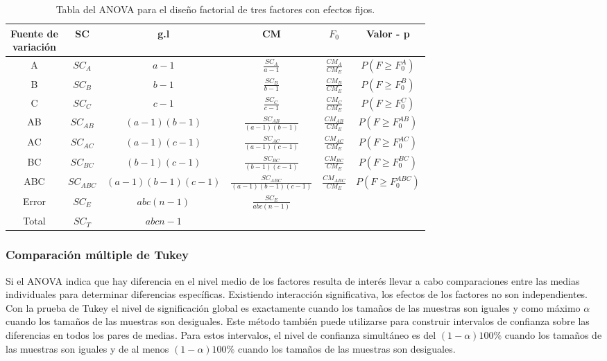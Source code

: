 \begin{table}
	\centering
	\begin{tabular}{|c|c|c|c|c|c|}
		\hline
		\makecell{Fuente de \\ variación} & SC & g.l & CM & $F_{0}$ & Valor - p \\ %
		\hline
		A & $SC_{A}$ & $a-1$ & $\frac{SC_{A}}{a-1}$ &  $\frac{CM_{A}}{CM_{E}}$ & $P(F \geq F_{0}^{A} )$ \\
		\hline
		B & $SC_{B}$ & $b-1$ & $\frac{SC_{B}}{b-1}$ &  $\frac{CM_{B}}{CM_{E}}$ & $P(F \geq F_{0}^{B} )$ \\
		\hline
		C & $SC_{C}$ & $c-1$ & $\frac{SC_{C}}{c-1}$ &  $\frac{CM_{C}}{CM_{E}}$ & $P(F \geq F_{0}^{C} )$ \\
		\hline
		AB & $SC_{AB}$ & $(a-1)(b-1)$ & $\frac{SC_{AB}}{(a-1)(b-1)}$ &  $\frac{CM_{AB}}{CM_{E}}$ & $P(F \geq F_{0}^{AB} )$ \\
		\hline
		AC & $SC_{AC}$ & $(a-1)(c-1)$ & $\frac{SC_{AC}}{(a-1)(c-1)}$ &  $\frac{CM_{AC}}{CM_{E}}$ & $P(F \geq F_{0}^{AC} )$ \\
		\hline
		BC & $SC_{BC}$ & $(b-1)(c-1) $ & $\frac{SC_{BC}}{(b-1)(c-1)}$ &  $\frac{CM_{BC}}{CM_{E}}$ & $P(F \geq F_{0}^{BC} )$ \\
		\hline
		ABC & $SC_{ABC}$ & $(a-1)(b-1)(c-1)$ & $\frac{SC_{ABC}}{(a-1)(b-1)(c-1)}$ &  $\frac{CM_{ABC}}{CM_{E}}$ & $P(F \geq F_{0}^{ABC} )$ \\
		\hline
		Error & $SC_{E} $ & $abc(n-1)$ & $\frac{SC_{E}}{abc(n-1)}$ & & \\
		\hline
		Total & $SC_{T}$ & $abcn-1$ & & &  \\
		\hline
	\end{tabular}
	\caption{Tabla del ANOVA para el diseño factorial de tres factores con efectos fijos.}
\end{table}
\FloatBarrier

\subsubsection{Comparación múltiple de Tukey \parencite{montgomery-2017}}

Si el ANOVA indica que hay diferencia en el nivel medio de los factores resulta de interés llevar a cabo comparaciones entre las medias individuales para determinar diferencias específicas. Existiendo interacción significativa, los efectos de los factores no son independientes.\\


Con la prueba de Tukey el nivel de significación global es exactamente  cuando los tamaños de las muestras son iguales y como máximo $\alpha$ cuando los tamaños de las muestras son desiguales. Este método también puede utilizarse para construir intervalos de confianza sobre las diferencias en todos los pares de medias. Para estos intervalos, el nivel de confianza simultáneo es del $(1-\alpha)100\%$ cuando los tamaños de las muestras son iguales y de al menos $(1-\alpha)100\%$  cuando los tamaños de las muestras son desiguales.\\

